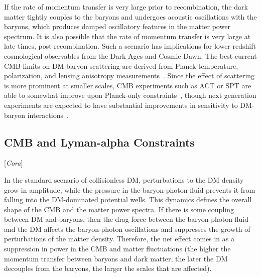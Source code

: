 \documentclass[12pt]{article}
\newcommand{\Contributors}[1]{ {\footnotesize [\textit{#1}]}}
\begin{document}
If the rate of momentum transfer is very large prior to recombination, the dark matter tightly couples to the baryons and undergoes acoustic oscillations with the baryons, which produces damped oscillatory features in the matter power spectrum.
It is also possible that the rate of momentum transfer is very large at late times, post recombination.
Such a scenario has implications for lower redshift cosmological observables from the Dark Ages and Cosmic Dawn.
The best current CMB limits on DM-baryon scattering are derived from Planck temperature, polarization, and lensing anisotropy measurements~\cite{Boddy:2018kfv,Gluscevic:2017ywp,Boddy:2018wzy,Xu:2018efh,Slatyer:2018aqg}.
Since the effect of scattering is more prominent at smaller scales, CMB experiments such as ACT or SPT are able to somewhat improve upon Planck-only constraints~\cite{Slatyer:2018aqg}, though next generation experiments are expected to have substantial improvements in sensitivity to DM-baryon interactions~\cite{Li:2018zdm}.

\subsection{CMB and Lyman-alpha Constraints}
\Contributors{Cora}

In the standard scenario of collisionless DM, perturbations to
the DM density grow in amplitude, while the pressure in the baryon-photon fluid prevents it from falling into
the DM-dominated potential wells. This dynamics defines the overall shape of the CMB and the matter power spectra.
If there is some coupling between DM and baryons, then the drag force between the baryon-photon fluid and the DM affects the baryon-photon oscillations and suppresses the
growth of perturbations of the matter density. Therefore, the net effect comes in as a suppression in power in the CMB and matter fluctuations (the higher the momentum transfer between baryons and dark matter, the later the DM decouples from the baryons, the larger the scales that are affected).
\end{document}
